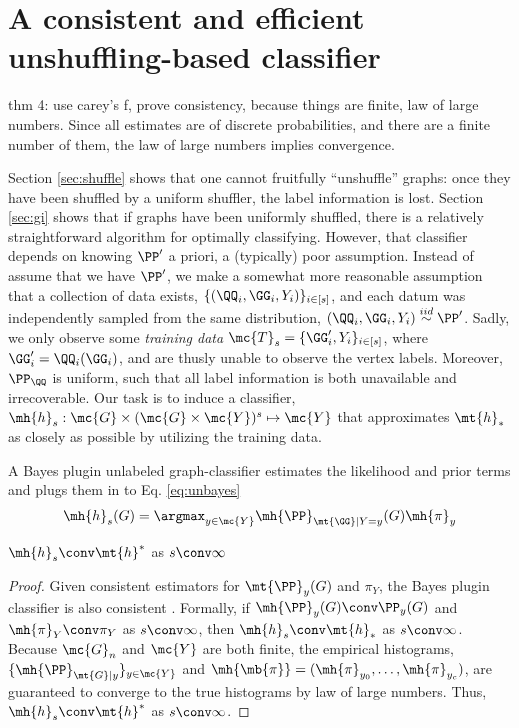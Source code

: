 \documentclass[10pt,journal,cspaper,compsoc]{IEEEtran}
\begin{document}
\section{A consistent and efficient unshuffling-based classifier} %
\label{sec:bayes_optimal_graph_invariant_based_classifier}


thm 4: use carey's f, prove consistency, because things are finite, law of large numbers.  Since all estimates are of discrete probabilities, and there are a finite number of them, the law of large numbers implies convergence.


Section \ref{sec:shuffle} shows that one cannot fruitfully ``unshuffle'' graphs: once they have been shuffled by a uniform shuffler, the label information is lost.  Section \ref{sec:gi} shows that if graphs have been uniformly shuffled, there is a relatively straightforward algorithm for optimally classifying. However, that classifier depends on knowing $\PP'$ a priori, a (typically) poor assumption. Instead of assume that we have $\PP'$, we make a somewhat more reasonable assumption that a collection of data exists, $\{(\QQ_i,\GG_i,Y_i)\}_{i \in [s]}$, and each datum was independently sampled from the same distribution, $(\QQ_i,\GG_i,Y_i)\overset{iid}{\sim}\PP'$.  Sadly, we only observe some \emph{training data} $\mc{T}_s=\{\GG_i',Y_i\}_{i \in [s]}$, where $\GG_i'=\QQ_i(\GG_i)$, and are thusly unable to observe the vertex labels.  Moreover, $\PP_{\QQ}$ is uniform, such that all label information is both unavailable and irrecoverable.  Our task is to induce a classifier, $\mh{h}_s: \mc{G} \times (\mc{G} \times \mc{Y})^s \mapsto \mc{Y}$ that approximates $\mt{h}_*$ as closely as possible by utilizing the training data.  

A Bayes plugin unlabeled graph-classifier estimates the likelihood and prior terms and plugs them in to Eq. \eqref{eq:unbayes}
\begin{align} \label{eq:class}
	\mh{h}_s(G)=\argmax_{y\in\mc{Y}} \mh{\PP}_{\mt{\GG}|Y=y}(G)\mh{\pi}_y
\end{align}

\begin{thm} \label{thm:conv}
	$\mh{h}_s \conv \mt{h}^*$ as $s \conv \infty$
\end{thm}

\begin{proof}
Given consistent estimators for $\mt{\PP}_y(G)$ and $\pi_Y$, the Bayes plugin classifier is also consistent \cite{DEV96}.  Formally, if $\mh{\PP}_y(G) \conv \PP_y(G)$ and $\mh{\pi}_Y\conv \pi_Y$ as $s \conv \infty$, then $\mh{h}_s \conv \mt{h}_*$ as $s\conv \infty$.  Because $\mc{G}_n$ and $\mc{Y}$ are both finite, the empirical histograms, $\{\mh{\PP}_{\mt{G}|y}\}_{y\in \mc{Y}}$ and $\mh{\mb{\pi}}=(\mh{\pi}_{y_0},\ldots, \mh{\pi}_{y_{c}})$, are guaranteed to converge to the true histograms by law of large numbers.  Thus, $\mh{h}_s \conv \mt{h}^*$ as $s \conv \infty$.
\end{proof}
\end{document}

